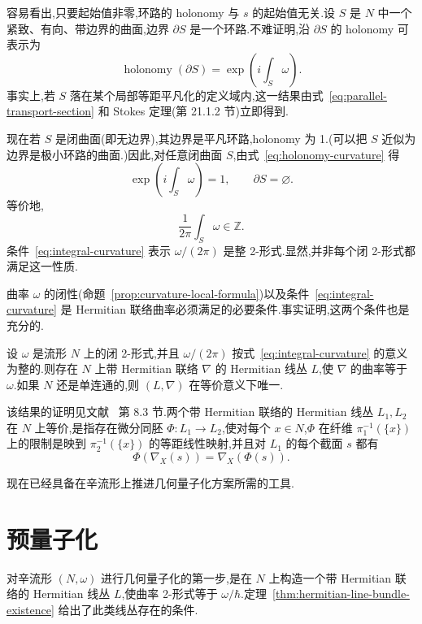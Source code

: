 容易看出,只要起始值非零,环路的 holonomy 与 $s$ 的起始值无关.设 $S$ 是 $N$ 中一个紧致、有向、带边界的曲面,边界 $\partial S$ 是一个环路.不难证明,沿 $\partial S$ 的 holonomy 可表示为
\[
 \operatorname{holonomy}(\partial S)=\exp\left(i\int_S\omega\right).
 \label{eq:holonomy-curvature}
\]
事实上,若 $S$ 落在某个局部等距平凡化的定义域内,这一结果由式~\eqref{eq:parallel-transport-section} 和 Stokes 定理(第 21.1.2 节)立即得到.

现在若 $S$ 是闭曲面(即无边界),其边界是平凡环路,holonomy 为 1.(可以把 $S$ 近似为边界是极小环路的曲面.)因此,对任意闭曲面 $S$,由式~\eqref{eq:holonomy-curvature} 得
\[
 \exp\left(i\int_S\omega\right)=1,
 \qquad \partial S=\varnothing.
 \label{eq:integral-curvature-exponential}
\]
等价地,
\[
 \frac{1}{2\pi}\int_S\omega\in\mathbb Z.
 \label{eq:integral-curvature}
\]
条件~\eqref{eq:integral-curvature} 表示 $\omega/(2\pi)$ 是整 2-形式.显然,并非每个闭 2-形式都满足这一性质.

曲率 $\omega$ 的闭性(命题~\ref{prop:curvature-local-formula})以及条件~\eqref{eq:integral-curvature} 是 Hermitian 联络曲率必须满足的必要条件.事实证明,这两个条件也是充分的.

\begin{theorem}
\label{thm:hermitian-line-bundle-existence}
设 $\omega$ 是流形 $N$ 上的闭 2-形式,并且 $\omega/(2\pi)$ 按式~\eqref{eq:integral-curvature} 的意义为整的.则存在 $N$ 上带 Hermitian 联络 $\nabla$ 的 Hermitian 线丛 $L$,使 $\nabla$ 的曲率等于 $\omega$.如果 $N$ 还是单连通的,则 $(L,\nabla)$ 在等价意义下唯一.
\end{theorem}

该结果的证明见文献~\cite{Woodhouse1992} 第 8.3 节.两个带 Hermitian 联络的 Hermitian 线丛 $L_1,L_2$ 在 $N$ 上等价,是指存在微分同胚 $\Phi:L_1\to L_2$,使对每个 $x\in N$,$\Phi$ 在纤维 $\pi_1^{-1}(\{x\})$ 上的限制是映到 $\pi_2^{-1}(\{x\})$ 的等距线性映射,并且对 $L_1$ 的每个截面 $s$ 都有
\[
 \Phi(\nabla_X(s))=\nabla_X(\Phi(s)).
\]

现在已经具备在辛流形上推进几何量子化方案所需的工具.

\section{预量子化}
\label{sec:geometric-quantization-prequantization}

对辛流形 $(N,\omega)$ 进行几何量子化的第一步,是在 $N$ 上构造一个带 Hermitian 联络的 Hermitian 线丛 $L$,使曲率 2-形式等于 $\omega/\hbar$.定理~\ref{thm:hermitian-line-bundle-existence} 给出了此类线丛存在的条件.

